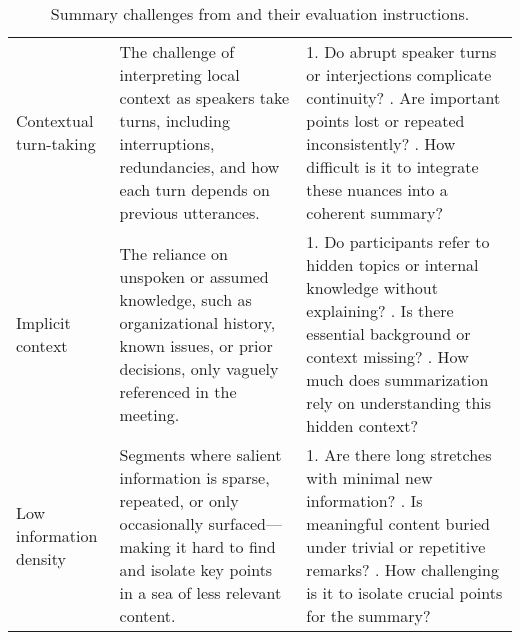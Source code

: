 \begin{table*}[ht]
\begin{tabularx}{\textwidth}{@{} l Y Y @{}}
    Contextual turn-taking &
    The challenge of interpreting local context as speakers take turns, including interruptions, redundancies, and how each turn depends on previous utterances. &
    1. Do abrupt speaker turns or interjections complicate continuity? . Are important points lost or repeated inconsistently? . How difficult is it to integrate these nuances into a coherent summary? \\
    \addlinespace

    Implicit context &
    The reliance on unspoken or assumed knowledge, such as organizational history, known issues, or prior decisions, only vaguely referenced in the meeting. &
    1. Do participants refer to hidden topics or internal knowledge without explaining? . Is there essential background or context missing? . How much does summarization rely on understanding this hidden context? \\
    \addlinespace

    Low information density &
    Segments where salient information is sparse, repeated, or only occasionally surfaced---making it hard to find and isolate key points in a sea of less relevant content. &
    1. Are there long stretches with minimal new information? . Is meaningful content buried under trivial or repetitive remarks? . How challenging is it to isolate crucial points for the summary? \\
    \bottomrule
  \end{tabularx}
  \caption{Summary challenges from \citet{KirsteinWRG24a} and their evaluation instructions.}
  \label{tab:summary_challenges}
\end{table*}
